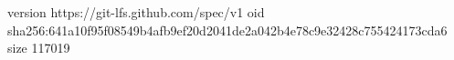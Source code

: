 version https://git-lfs.github.com/spec/v1
oid sha256:641a10f95f08549b4afb9ef20d2041de2a042b4e78c9e32428c755424173cda6
size 117019
